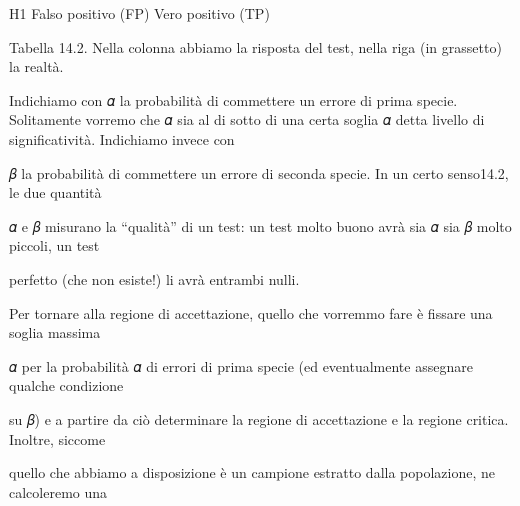 \documentclass[a4paper,portrait,12pt]{article}
\begin{document}
\begin{flushleft}
H1 Falso positivo (FP) Vero positivo (TP)
\end{flushleft}


\begin{flushleft}
Tabella 14.2. Nella colonna abbiamo la risposta del test, nella riga (in grassetto) la realt\`{a}.
\end{flushleft}





\begin{flushleft}
Indichiamo con 𝛼 la probabilit\`{a} di commettere un errore di prima specie. Solitamente vorremo che 𝛼 sia al di sotto di una certa soglia 𝛼 detta livello di significativit\`{a}. Indichiamo invece con
\end{flushleft}


\begin{flushleft}
𝛽 la probabilit\`{a} di commettere un errore di seconda specie. In un certo senso14.2, le due quantit\`{a}
\end{flushleft}


\begin{flushleft}
𝛼 e 𝛽 misurano la {``}qualit\`{a}'' di un test: un test molto buono avr\`{a} sia 𝛼 sia 𝛽 molto piccoli, un test
\end{flushleft}


\begin{flushleft}
perfetto (che non esiste!) li avr\`{a} entrambi nulli.
\end{flushleft}


\begin{flushleft}
Per tornare alla regione di accettazione, quello che vorremmo fare \`{e} fissare una soglia massima
\end{flushleft}


\begin{flushleft}
𝛼 per la probabilit\`{a} 𝛼 di errori di prima specie (ed eventualmente assegnare qualche condizione
\end{flushleft}


\begin{flushleft}
su 𝛽) e a partire da ci\`{o} determinare la regione di accettazione e la regione critica. Inoltre, siccome
\end{flushleft}


\begin{flushleft}
quello che abbiamo a disposizione \`{e} un campione estratto dalla popolazione, ne calcoleremo una
\end{flushleft}
\end{document}
